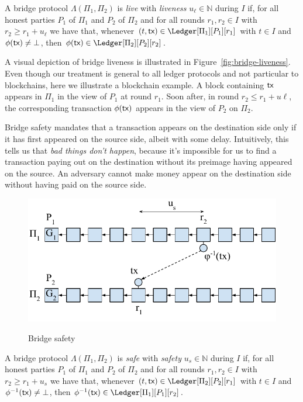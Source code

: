 \begin{definition}
  A bridge protocol $\Lambda(\Pi_1, \Pi_2)$ is \emph{live} with \emph{liveness} $u_\ell \in \mathbb{N}$
  during $I$ if, for all honest parties $P_1$ of $\Pi_1$ and $P_2$ of $\Pi_2$ and for all rounds
  $r_1, r_2 \in I$ with $r_2 \geq r_1 + u_\ell$ we have that, whenever $(t, \tx) \in \Ledger[\Pi_1][P_1][r_1]$
  with $t \in I$ and $\phi(\textsf{tx}) \neq \bot$, then $\phi(\tx) \in \Ledger[\Pi_2][P_2][r_2]$.
\end{definition}

A visual depiction of bridge liveness is illustrated in Figure~\ref{fig:bridge-liveness}.
Even though our treatment is general to all ledger protocols and not particular to blockchains,
here we illustrate a blockchain example. A block containing $\textsf{tx}$ appears in $\Pi_1$ in the view
of $P_1$ at round $r_1$. Soon after, in round $r_2 \leq r_1 + u\ell$, the corresponding transaction
$\phi(\textsf{tx})$ appears in the view of $P_2$ on $\Pi_2$.

Bridge safety mandates that a transaction appears on the destination side only if it has first
appeared on the source side, albeit with some delay. Intuitively, this tells us that \emph{bad
things don't happen}, because it's impossible for us to find a transaction paying out on the
destination without its preimage having appeared on the source. An adversary cannot make money
appear on the destination side without having paid on the source side.

\begin{figure}
    \center
    \includegraphics[width=0.8\columnwidth]{figures/bridge-safety.pdf}
    \label{fig:bridge-safety}
    \caption{Bridge safety}
\end{figure}

\begin{definition}
  A bridge protocol $\Lambda(\Pi_1, \Pi_2)$ is \emph{safe} with \emph{safety} $u_s \in \mathbb{N}$
  during $I$ if, for all honest parties $P_1$ of $\Pi_1$ and $P_2$ of $\Pi_2$ and for all rounds
  $r_1, r_2 \in I$ with $r_2 \geq r_1 + u_s$ we have that, whenever $(t, \tx) \in \Ledger[\Pi_2][P_2][r_1]$
  with $t \in I$ and $\phi^{-1}(\textsf{tx}) \neq \bot$, then
  $\phi^{-1}(\tx) \in \Ledger[\Pi_1][P_1][r_2]$.
\end{definition}

